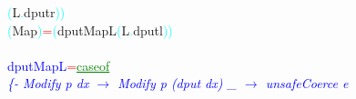 \textcolor{cyan}{(}{\rm{}L}\textcolor{cyan}{.}{\rm{}dputr}\textcolor{cyan}{)}\textcolor{cyan}{)}\\\hsspace \textcolor{cyan}{(}{\rm{}Map}\textcolor{cyan}{)}\hsspace \textcolor{red}{=}\hsspace \textcolor{cyan}{(}{\rm{}dputMapL}\hsspace \textcolor{cyan}{(}{\rm{}L}\textcolor{cyan}{.}{\rm{}dputl}\textcolor{cyan}{)}\textcolor{cyan}{)}\\\\\textcolor{blue}{dputMapL}\hsspace \textcolor{red}{=}\hsspace \textcolor{green}{\underline{case}}\hsspace \textcolor{green}{\underline{of}}\\\hstab \textcolor{blue}{{\it{}\{-
	Modify p dx \ensuremath{\rightarrow} Modify p (dput dx)
	\_ \ensuremath{\rightarrow} unsafeCoerce e
}}

